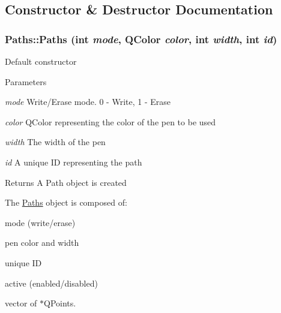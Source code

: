 \subsection{Constructor \& Destructor Documentation}
\hypertarget{classPaths_a66d8dd2a1590fe53cc7b6fb5d794714c}{
\subsubsection[{Paths}]{\setlength{\rightskip}{0pt plus 5cm}Paths::Paths (int {\em mode}, \/  QColor {\em color}, \/  int {\em width}, \/  int {\em id})}}
\label{classPaths_a66d8dd2a1590fe53cc7b6fb5d794714c}
Default constructor 
\begin{DoxyParams}{Parameters}
\item[{\em mode}]Write/Erase mode. 0 -\/ Write, 1 -\/ Erase \item[{\em color}]QColor representing the color of the pen to be used \item[{\em width}]The width of the pen \item[{\em id}]A unique ID representing the path\end{DoxyParams}
\begin{DoxyReturn}{Returns}
A Path object is created
\end{DoxyReturn}
The \hyperlink{classPaths}{Paths} object is composed of:
\begin{DoxyItemize}
\item mode (write/erase)
\item pen color and width
\item unique ID
\item active (enabled/disabled)
\item vector of $\ast$QPoints.
\end{DoxyItemize}

